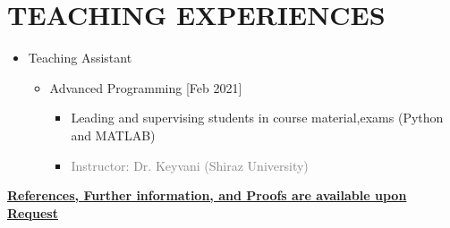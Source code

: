 \documentclass[10pt,a4paper,sans]{moderncv} %
\begin{document}
	
	
	\vspace{  -0.9 em}
	\vspace{-2em}
	\section{TEACHING EXPERIENCES}
	\begin{itemize}
		\item Teaching Assistant
		\begin{itemize}

			\item {} Advanced Programming \hfill  [Feb 2021]
			\begin{itemize} 
				\item Leading and supervising students in course material,exams (Python and MATLAB)
				\item\textcolor{gray}{Instructor: Dr. Keyvani (Shiraz University)}
			\end{itemize}
			
				\newline
			
		\end{itemize}
	\end{itemize}
	
	
	\vspace{1.3 em}
	
	
	
	\centerline{\underline{\textbf{	\faExclamationCircle \hspace{0.5 pt} References, Further information, and Proofs are available upon Request }}}
	
\end{document}
